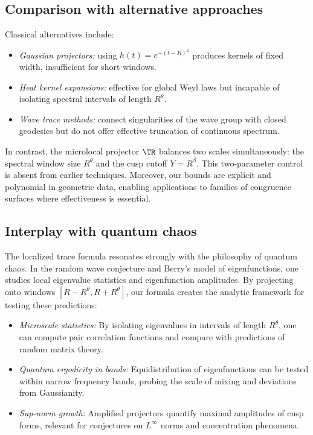 \subsection*{Comparison with alternative approaches}

Classical alternatives include:
\begin{itemize}
\item \emph{Gaussian projectors:} using $h(t)=e^{-(t-R)^2}$ produces kernels of fixed width, insufficient for short windows.
\item \emph{Heat kernel expansions:} effective for global Weyl laws but incapable of isolating spectral intervals of length $R^\theta$.
\item \emph{Wave trace methods:} connect singularities of the wave group with closed geodesics but do not offer effective truncation of continuous spectrum.
\end{itemize}

In contrast, the microlocal projector $\TR$ balances two scales simultaneously: the spectral window size $R^\theta$ and the cusp cutoff $Y=R^\beta$. This two-parameter control is absent from earlier techniques. Moreover, our bounds are explicit and polynomial in geometric data, enabling applications to families of congruence surfaces where effectiveness is essential.

\subsection*{Interplay with quantum chaos}

The localized trace formula resonates strongly with the philosophy of quantum chaos. In the random wave conjecture and Berry’s model of eigenfunctions, one studies local eigenvalue statistics and eigenfunction amplitudes. By projecting onto windows $[R-R^\theta,R+R^\theta]$, our formula creates the analytic framework for testing these predictions:
\begin{itemize}
\item \emph{Microscale statistics:} By isolating eigenvalues in intervals of length $R^\theta$, one can compute pair correlation functions and compare with predictions of random matrix theory.
\item \emph{Quantum ergodicity in bands:} Equidistribution of eigenfunctions can be tested within narrow frequency bands, probing the scale of mixing and deviations from Gaussianity.
\item \emph{Sup-norm growth:} Amplified projectors quantify maximal amplitudes of cusp forms, relevant for conjectures on $L^\infty$ norms and concentration phenomena.
\end{itemize}

